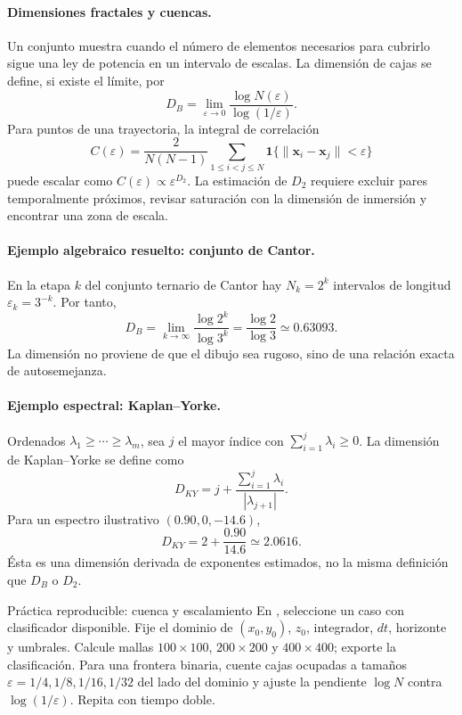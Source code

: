 \paragraph{Dimensiones fractales y cuencas.}
Un conjunto muestra  cuando el número de elementos
necesarios para cubrirlo sigue una ley de potencia en un intervalo de escalas. La
dimensión de cajas se define, si existe el límite, por
\[
 D_B=\lim_{\varepsilon\to0}
 \frac{\log N(\varepsilon)}{\log(1/\varepsilon)}.
\]
Para puntos de una trayectoria, la integral de correlación
\[
 C(\varepsilon)=\frac{2}{N(N-1)}
 \sum_{1\leq i<j\leq N}
 \mathbf 1\{\|\mathbf x_i-\mathbf x_j\|<\varepsilon\}
\]
puede escalar como \(C(\varepsilon)\propto\varepsilon^{D_2}\). La estimación de
\(D_2\) requiere excluir pares temporalmente próximos, revisar saturación con la
dimensión de inmersión y encontrar una zona de escala.

\paragraph{Ejemplo algebraico resuelto: conjunto de Cantor.}
En la etapa \(k\) del conjunto ternario de Cantor hay \(N_k=2^k\) intervalos de
longitud \(\varepsilon_k=3^{-k}\). Por tanto,
\[
 D_B=\lim_{k\to\infty}\frac{\log2^k}{\log3^k}
 =\frac{\log2}{\log3}\simeq0.63093.
\]
La dimensión no proviene de que el dibujo sea rugoso, sino de una relación exacta de
autosemejanza.

\paragraph{Ejemplo espectral: Kaplan--Yorke.}
Ordenados \(\lambda_1\geq\cdots\geq\lambda_m\), sea \(j\) el mayor índice con
\(\sum_{i=1}^j\lambda_i\geq0\). La dimensión de Kaplan--Yorke se define como
\[
 D_{KY}=j+\frac{\sum_{i=1}^j\lambda_i}{|\lambda_{j+1}|}.
\]
Para un espectro ilustrativo \((0.90,0,-14.6)\),
\[
 D_{KY}=2+\frac{0.90}{14.6}\simeq2.0616.
\]
Ésta es una dimensión derivada de exponentes estimados, no la misma definición que
\(D_B\) o \(D_2\).

\begin{activitybox}{Práctica reproducible: cuenca y escalamiento}
En , seleccione un caso con clasificador disponible. Fije el
dominio de \((x_0,y_0)\), \(z_0\), integrador, \(dt\), horizonte y umbrales. Calcule
mallas \(100\times100\), \(200\times200\) y \(400\times400\); exporte la
clasificación. Para una frontera binaria, cuente cajas ocupadas a tamaños
\(\varepsilon=1/4,1/8,1/16,1/32\) del lado del dominio y ajuste la pendiente
\(\log N\) contra \(\log(1/\varepsilon)\). Repita con tiempo doble.
\end{activitybox}


